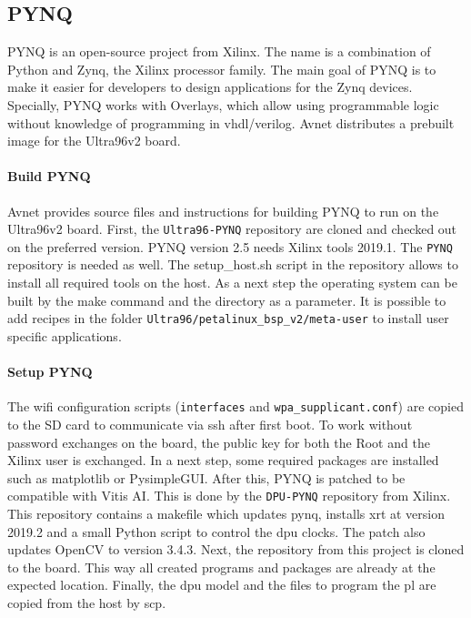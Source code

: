 \subsection{PYNQ}
\label{subsec:embedded_platform:operating_systems:pynq}

PYNQ is an open-source project from Xilinx.
The name is a combination of Python and Zynq, the Xilinx processor family.
The main goal of PYNQ is to make it easier for developers to design applications for the Zynq devices. 
Specially, PYNQ works with Overlays, which allow using programmable logic without knowledge of programming in vhdl/verilog.
Avnet distributes a prebuilt image for the Ultra96v2 board.

\paragraph{Build PYNQ}
Avnet provides source files and instructions for building PYNQ to run on the Ultra96v2 board.
First, the \texttt{Ultra96-PYNQ} repository are cloned and checked out on the preferred version.
PYNQ version 2.5 needs Xilinx tools 2019.1.
The \texttt{PYNQ} repository is needed as well.
The setup\_host.sh script in the repository allows to install all required tools on the host.
As a next step the operating system can be built by the make command and the directory as a parameter.
It is possible to add recipes in the folder \texttt{Ultra96/petalinux\_bsp\_v2/meta-user} to install user specific applications. 

\paragraph{Setup PYNQ}
The wifi configuration scripts (\texttt{interfaces} and \texttt{wpa\_supplicant.conf}) are copied to the SD card to communicate via \acrfull{ssh} after first boot.
To work without password exchanges on the board, the public key for both the Root and the Xilinx user is exchanged.
In a next step, some required packages are installed such as matplotlib or PysimpleGUI.
After this, PYNQ is patched to be compatible with Vitis AI.
This is done by the \texttt{DPU-PYNQ} repository from Xilinx.
This repository contains a makefile which updates pynq, installs \acrfull{xrt} at version 2019.2 and a small Python script to control the \acrfull{dpu} clocks.
The patch also updates OpenCV to version 3.4.3.
Next, the repository from this project is cloned to the board.
This way all created programs and packages are already at the expected location.
Finally, the \acrshort{dpu} model and the files to program the \acrfull{pl} are copied from the host by \acrfull{scp}.

